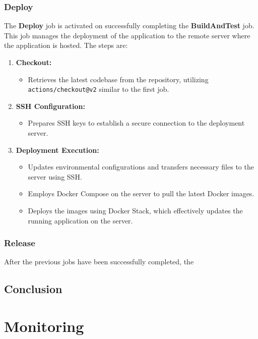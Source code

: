 \documentclass[12pt, a4paper, oneside]{book}
\begin{document}
\subsubsection{Deploy}
The \textbf{Deploy} job is activated on successfully completing the \textbf{BuildAndTest} job. This job manages the deployment of the application to the remote server where the application is hosted. The steps are:

\begin{enumerate}
    \item \textbf{Checkout:} 
    \begin{itemize}
        \item Retrieves the latest codebase from the repository, utilizing \texttt{actions/checkout@v2} similar to the first job.
    \end{itemize}
    
    \item \textbf{SSH Configuration:} 
    \begin{itemize}
        \item Prepares SSH keys to establish a secure connection to the deployment server.
    \end{itemize}
    
    \item \textbf{Deployment Execution:}
    \begin{itemize}
        \item Updates environmental configurations and transfers necessary files to the server using SSH.
        \item Employs Docker Compose on the server to pull the latest Docker images.
        \item Deploys the images using Docker Stack, which effectively updates the running application on the server.
    \end{itemize}
\end{enumerate}

 \subsubsection{Release}
 After the previous jobs have been successfully completed, the 

\subsection{Conclusion}


\section{Monitoring}
\end{document}
